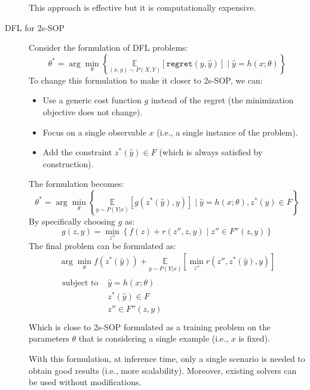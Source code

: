 \begin{description}
        \begin{remark}
            This approach is effective but it is computationally expensive.
        \end{remark}


    \item[DFL for 2s-SOP] 
        Consider the formulation of DFL problems:
        \[ 
            \theta^* = \arg\min_\theta \left\{\underset{(x, y) \sim P(X, Y)}{\mathbb{E}}\left[ \texttt{regret}(y, \hat{y}) \right] \mid \hat{y} = h(x; \theta) \right\} 
        \]
        To change this formulation to make it closer to 2s-SOP, we can:
        \begin{itemize}
            \item Use a generic cost function $g$ instead of the regret (the minimization objective does not change).
            \item Focus on a single observable $x$ (i.e., a single instance of the problem).
            \item Add the constraint $z^*(\hat{y}) \in F$ (which is always satisfied by construction).
        \end{itemize}
        The formulation becomes:
        \[ 
            \theta^* = \arg\min_\theta \left\{\underset{y \sim P(Y|x)}{\mathbb{E}}\left[ g(z^*(\hat{y}), y) \right] \mid \hat{y} = h(x; \theta), z^*(\hat{y}) \in F \right\} 
        \]
        By specifically choosing $g$ as:
        \[ g(z, y) = \min_{z''} \left\{ f(z) + r(z'', z, y) \mid z'' \in F''(z, y) \right\} \]
        The final problem can be formulated as:
        \[ 
            \begin{gathered}
                \arg\min_\theta f(z^*(\hat{y})) + \underset{y \sim P(Y|x)}{\mathbb{E}}\left[ \min_{z''} r(z'', z^*(\hat{y}), y) \right]  \\ 
                \begin{aligned}
                    \text{subject to } &\hat{y} = h(x; \theta) \\ 
                    &z^*(\hat{y}) \in F \\
                    &z'' \in F''(z, y) \\
                \end{aligned}
            \end{gathered}
        \]
        Which is close to 2s-SOP formulated as a training problem on the parameters $\theta$ that is considering a single example (i.e., $x$ is fixed).

        \begin{remark}
            With this formulation, at inference time, only a single scenario is needed to obtain good results (i.e., more scalability). Moreover, existing solvers can be used without modifications.
        \end{remark}


\end{description}
